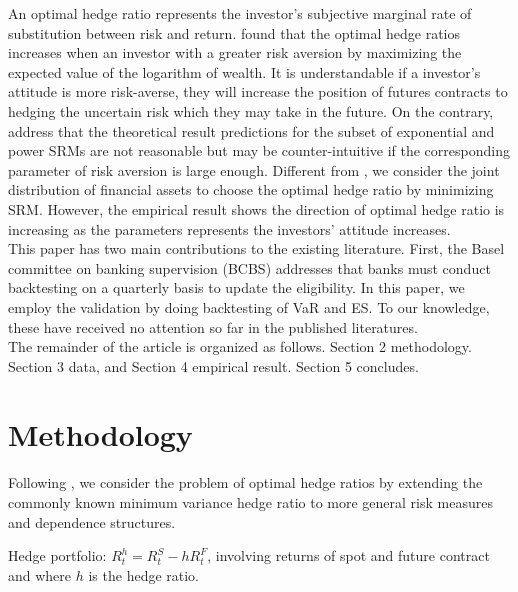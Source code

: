 \documentclass[11pt,a4paper,english]{article}
\begin{document}
An optimal hedge ratio represents the investor's subjective marginal rate of substitution between risk and return. \citet{cecchetti1988estimation} found that the optimal hedge ratios increases when an investor with a greater risk aversion by maximizing the expected value of the logarithm of wealth.
It is understandable if a investor's attitude is more risk-averse, they will increase the position of futures contracts to hedging the uncertain risk which they may take in the future.
On the contrary, \citet{brandtner2015decision} address that the theoretical result predictions for the subset of exponential and power SRMs are not reasonable but may be counter-intuitive if the corresponding parameter of risk aversion is large enough.
Different from \citet{brandtner2015decision}, we consider the joint distribution of financial assets to choose the optimal hedge ratio by minimizing SRM.
However, the empirical result shows the direction of optimal hedge ratio is increasing as the parameters represents the investors' attitude increases. \\

This paper has two main contributions to the existing literature.{ \color{red} First, the Basel committee on banking supervision (BCBS) addresses that banks must conduct backtesting on a quarterly basis to update the eligibility. In this paper, we employ the validation by doing backtesting of VaR and ES.} To our knowledge, these have received no attention so far in the published literatures.\\

The remainder
of the article is organized as follows. Section 2 methodology. Section 3 data, and Section 4 empirical result. Section 5 concludes.\\


\section{Methodology}\label{sec:methodology}
Following \citet{barbi2014copula}, we consider the problem of optimal
hedge ratios by extending the commonly known minimum variance hedge
ratio to more general risk measures and dependence
structures.\medskip

Hedge portfolio: $R_t^h = R_t^S - h R_t^F$, involving returns of spot
and future contract and where $h$ is the hedge ratio.\medskip
\end{document}
